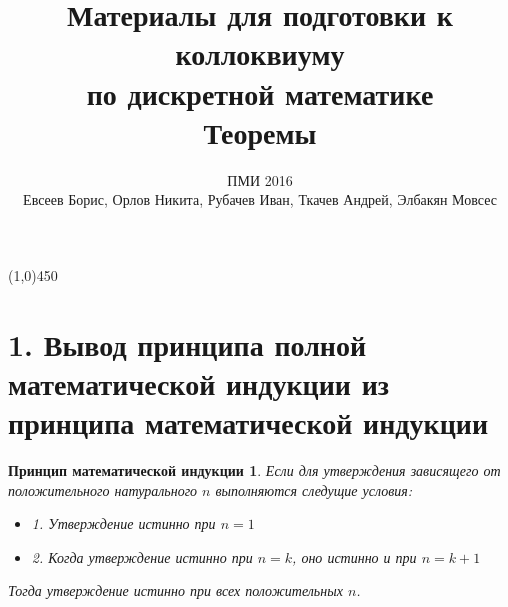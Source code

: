 \documentclass[a4paper,12pt]{article}
\newtheorem*{Induction_def} {Принцип математической индукции}
\begin{document}
	\title{Материалы для подготовки к коллоквиуму\\ по дискретной математике \\
	Теоремы}
	\author{ПМИ 2016 \\ Евсеев Борис, Орлов Никита, Рубачев Иван, Ткачев Андрей, Элбакян Мовсес}
	\maketitle
	
	\section*{}

	
	\begin{center}
		\line(1,0){450}
	\end{center}

    \newpage
	\section{1. Вывод принципа полной математической индукции из принципа математической индукции}

	\begin{Induction_def}
		Если для утверждения зависящего от положительного натурального $n$ выполняются следущие условия:
		\begin{itemize}
			\item 1. Утверждение истинно при $n = 1$
			\item 2. Когда утверждение истинно при $n = k$, оно истинно и при $n = k + 1$
		\end{itemize}
		Тогда утверждение истинно при всех положительных $n$.
	\end{Induction_def}
\end{document}
